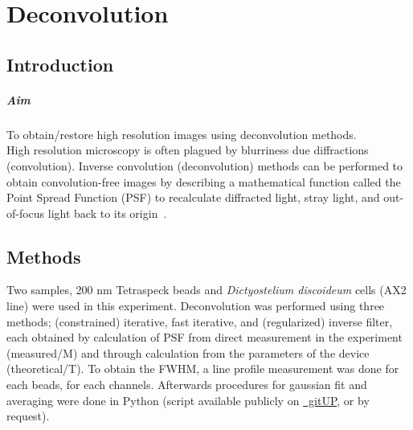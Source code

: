 
\chapter{Deconvolution}
\label{chp:Deconvolution}

\section{Introduction}

\paragraph{Aim} To obtain/restore high resolution images using deconvolution methods. 
\\

High resolution microscopy is often plagued by blurriness due diffractions (convolution). 
Inverse convolution (deconvolution) methods can be performed to obtain convolution-free images by describing a mathematical function called the Point Spread Function (PSF) to recalculate diffracted light, stray light, and out-of-focus light back to its origin~\cite{Lect10}.  


\section{Methods}

Two samples, 200 nm Tetraspeck beads and \textit{Dictyostelium discoideum} cells (AX2 line) were used in this experiment. 
Deconvolution was performed using three methods; (constrained) iterative, fast iterative, and (regularized) inverse filter, each obtained by calculation of PSF from direct measurement in the experiment (measured/M) and through calculation from the parameters of the device (theoretical/T). 
To obtain the FWHM, a line profile measurement was done for each beads, for each channels. 
Afterwards procedures for gaussian fit and averaging were done in \faPython Python (script available publicly on \href{https://gitup.uni-potsdam.de/showard/lightmicroscopy}{\faGitlab~gitUP}, or by request).

